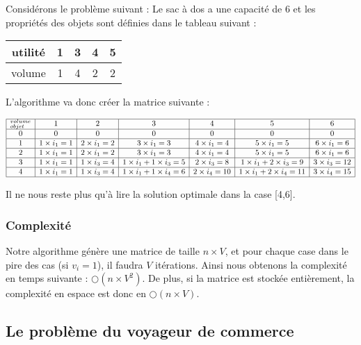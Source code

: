 Considérons le problème suivant :
Le sac à dos a une capacité de 6 et les propriétés des objets sont définies dans le tableau suivant
:
\begin{center}
\begin{tabular}{|c|c|c|c|c|} \hline
	utilité & 1 & 3 & 4 & 5 \\ \hline
	volume & 1 & 4 & 2 & 2 \\ \hline
\end{tabular}
\end{center}

L'algorithme va donc créer la matrice suivante :
\begin{center}
$$\begin{array}{|c|c|c|c|c|c|c|} \hline
  _{objet}^{volume} & 1 & 2 & 3 & 4 & 5 & 6 \\ \hline
	0		  & 0 & 0 & 0 & 0 & 0 & 0 \\ \hline
	1			& 1 \times i_1 = 1 & 2 \times i_1 = 2 & 3 \times i_1 = 3 & 4 \times i_1 = 4 & 5 \times i_1 = 5 & 6 \times i_1 = 6 \\ \hline
	2			& 1 \times i_1 = 1 & 2 \times i_1 = 2 & 3 \times i_1 = 3 & 4 \times i_1 = 4 & 5 \times i_1 = 5 & 6 \times i_1 = 6 \\ \hline
	3			& 1 \times i_1 = 1 & 1 \times i_3 = 4 & 1 \times i_1 + 1 \times i_3 = 5 & 2 \times i_3 = 8 & 1 \times i_1 + 2 \times i_3 = 9 & 3 \times i_3 = 12 \\ \hline
	4			& 1 \times i_1 = 1 & 1 \times i_3 = 4 & 1 \times i_1 + 1 \times i_4 = 6 & 2 \times i_4 = 10
	& 1 \times i_1 + 2 \times i_4 = 11  & 3 \times i_4 = 15 \\ \hline
\end{array}$$
\end{center}

Il ne nous reste plus qu'à lire la solution optimale dans la case [4,6].


\subsubsection{Complexité}
Notre algorithme génère une matrice de taille $n \times V$, et pour chaque case dans le pire des cas (si $v_i = 1$), il faudra $V$ 
itérations. Ainsi nous obtenons la complexité en temps suivante : $\bigcirc(n\times V^2)$.
De plus, si la matrice est stockée entièrement, la complexité en espace est donc en $\bigcirc(n\times V)$.

\subsection{Le problème du voyageur de commerce}


